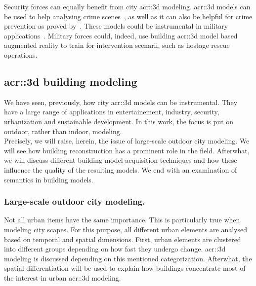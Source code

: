             Security forces can equally benefit from city \gls{acr::3d} modeling.
            \gls{acr::3d} models can be used to help analysing crime scenes~\parencite{wolff2009towards}, as well as it can also be helpful for crime prevention as proved by~\textcite{wolff2008geospatial}.
            These models could be instrumental in military applications~\parencite{zlatanova2002trends, budroni2010automatic}.
            Military forces could, indeed, use building \gls{acr::3d} model based augmented reality to train for intervention scenarii, such as hostage rescue operations.

    \subsection{\texorpdfstring{\gls*{acr::3d}}{3D} building modeling}
        \label{subsec::introduction::urban_3d_reconstruction::building_3d_modeling}
        We have seen, previously, how city \gls{acr::3d} models can be instrumental.
        They have a large range of applications in entertainement, industry, security, urbanization and sustainable development.
        In this work, the focus is put on outdoor, rather than indoor, modeling.\\

        Precisely, we will raise, herein, the issue of large-scale outdoor city modeling.
        We will see how building reconstruction has a prominent role in the field.
        Afterwhat, we will discuss different building model acquisition techniques and how these influence the quality of the resulting models.
        We end with an examination of semantics in building models.

        \subsubsection{Large-scale outdoor city modeling.}
            Not all urban items have the same importance.
            This is particularly true when modeling city scapes.
            For this purpose, all different urban elements are analysed based on temporal and spatial dimensions.
            First, urban elements are clustered into different groups depending on how fast they undergo change.
            \gls{acr::3d} modeling is discussed depending on this mentioned categorization.
            Afterwhat, the spatial differentiation will be used to explain how buildings concentrate most of the interest in urban \gls{acr::3d} modeling.\\

